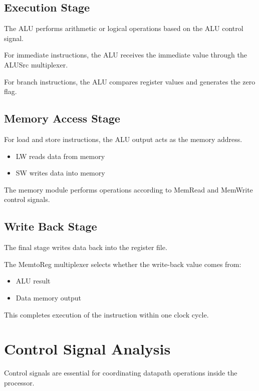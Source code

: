 \documentclass[conference]{IEEEtran}
\begin{document}
\subsection{Execution Stage}

The ALU performs arithmetic or logical operations based on the ALU control signal.

For immediate instructions, the ALU receives the immediate value through the ALUSrc multiplexer.

For branch instructions, the ALU compares register values and generates the zero flag.

\subsection{Memory Access Stage}

For load and store instructions, the ALU output acts as the memory address.

\begin{itemize}
    \item LW reads data from memory
    \item SW writes data into memory
\end{itemize}

The memory module performs operations according to MemRead and MemWrite control signals.

\subsection{Write Back Stage}

The final stage writes data back into the register file.

The MemtoReg multiplexer selects whether the write-back value comes from:
\begin{itemize}
    \item ALU result
    \item Data memory output
\end{itemize}

This completes execution of the instruction within one clock cycle.


\section{Control Signal Analysis}

Control signals are essential for coordinating datapath operations inside the processor.
\end{document}
